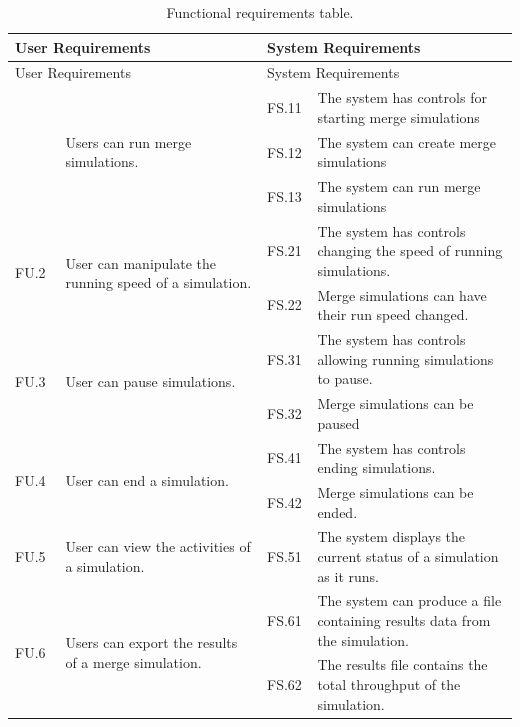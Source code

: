 \begin{longtable}{|p{0.1\linewidth}|p{0.4\linewidth}|p{0.1\linewidth}|p{0.4\linewidth}|}
\caption{Functional requirements table.}\label{tab:functionalRequirements}\\
\hline
\multicolumn{2}{|l|}{User Requirements} & \multicolumn{2}{l|}{System Requirements} \\
\hline
\endfirsthead

\hline
\multicolumn{2}{|l|}{User Requirements} & \multicolumn{2}{l|}{System Requirements} \\
\hline
\endhead

\hline
\endfoot

\hline
\endlastfoot

\multirow{3}{*}{FU.1} & \multirow{3}{*}{\parbox{\linewidth}{Users can run merge simulations.}} 
 & FS.11 & The system has controls for starting merge simulations \\
 &  & FS.12 & The system can create merge simulations \\
 &  & FS.13 & The system can run merge simulations \\
\hline
\multirow{2}{*}{FU.2} & \multirow{2}{*}{\parbox{\linewidth}{User can manipulate the running speed of a simulation.}}
 & FS.21 & The system has controls changing the speed of running simulations. \\
 &  & FS.22 & Merge simulations can have their run speed changed. \\ 
\hline
\multirow{2}{*}{FU.3} & \multirow{2}{*}{\parbox{\linewidth}{User can pause simulations.}}
 & FS.31 & The system has controls allowing running simulations to pause. \\
 &  & FS.32 & Merge simulations can be paused \\ 
\hline
\multirow{2}{*}{FU.4} & \multirow{2}{*}{\parbox{\linewidth}{User can end a simulation.}}
 & FS.41 & The system has controls ending simulations. \\
 &  & FS.42 & Merge simulations can be ended. \\ 
\hline
FU.5 & User can view the activities of a simulation. & FS.51 & The system displays the current status of a simulation as it runs. \\
\hline
\multirow{9}{*}{FU.6} & \multirow{9}{*}{\parbox{\linewidth}{Users can export the results of a merge simulation.}}
 & FS.61 & The system can produce a file containing results data from the simulation. \\
 &  & FS.62 & The results file contains the total throughput of the simulation. \\

\end{longtable}
